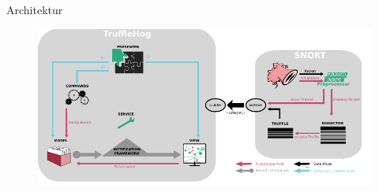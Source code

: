 \begin{frame}{Architektur}
    \begin{figure}
    	\centering
    	\includegraphics[width=\textwidth]{./images/arch/15.pdf}
    \end{figure}
\end{frame}
